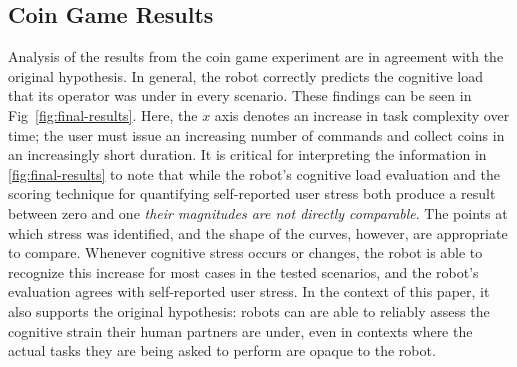 \documentclass{sig-alternate}
\begin{document}

\subsection{Coin Game Results}

Analysis of the results from the coin game experiment are in agreement
with the original hypothesis. In general, the robot correctly predicts
the cognitive load that its operator was under in every
scenario. These findings can be seen in Fig~\ref{fig:final-results}.
Here, the $x$ axis denotes an increase in task complexity over time;
the user must issue an increasing number of commands and collect coins
in an increasingly short duration. It is critical for interpreting the
information in \ref{fig:final-results} to note that while the robot's
cognitive load evaluation and the scoring technique for quantifying
self-reported user stress both produce a result between zero and one
\textit{their magnitudes are not directly comparable}.  The points at
which stress was identified, and the shape of the curves, however, are
appropriate to compare.  Whenever cognitive stress occurs or changes,
the robot is able to recognize this increase for most cases in the
tested scenarios, and the robot's evaluation agrees with self-reported
user stress.  In the context of this paper, it also supports the
original hypothesis: robots can are able to reliably assess the
cognitive strain their human partners are under, even in contexts
where the actual tasks they are being asked to perform are opaque to
the robot.
\end{document}

